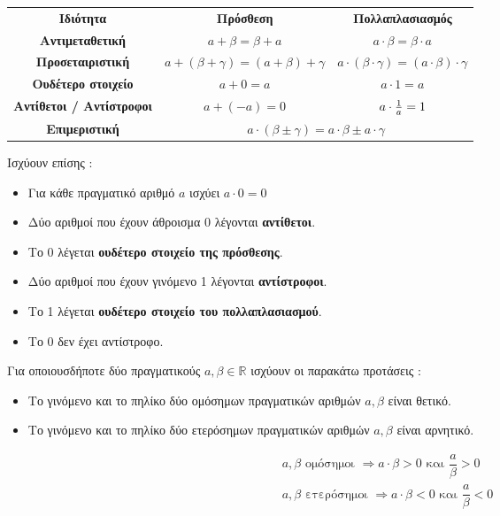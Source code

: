 \documentclass[twoside,nofonts,internet,shmeiwseis]{thewria}
\DeclareRobustCommand{\frac}[3][0pt]{%
{\begingroup\hspace{#1}#2\hspace{#1}\endgroup\over\hspace{#1}#3\hspace{#1}}}
\begin{document}
\begin{center}
\begin{tabular}{ccc}
	\hline \rule[-2ex]{0pt}{5.5ex} \textbf{Ιδιότητα} & \textbf{Πρόσθεση} & \textbf{Πολλαπλασιασμός} \\ 
	\hhline{===} \rule[-2ex]{0pt}{5.5ex} \textbf{Αντιμεταθετική} & $ a+\beta=\beta+a $ & $ a\cdot\beta=\beta\cdot a $ \\
	\rule[-2ex]{0pt}{5ex} \textbf{Προσεταιριστική} & $ a+\left( \beta+\gamma\right) =\left( a+\beta\right) +\gamma $ & $ a\cdot\left( \beta\cdot\gamma\right) =\left( a\cdot\beta\right)\cdot\gamma $\\
	\rule[-2ex]{0pt}{5ex} \textbf{Ουδέτερο στοιχείο} & $ a+0=a $ & $ a\cdot1= a $\\
	\rule[-2ex]{0pt}{5ex} \textbf{Αντίθετοι / Αντίστροφοι} & $ a+(-a)=0 $ & $ a\cdot\frac{1}{a}= 1 $\\
	\rule[-2ex]{0pt}{5ex} \textbf{Επιμεριστική} & \multicolumn{2}{c}{$ a\cdot\left( \beta\pm\gamma\right)=a\cdot\beta\pm a\cdot\gamma  $}\\
	\hline
\end{tabular}
\end{center}
Ισχύουν επίσης :
\begin{itemize}[itemsep=0mm]
\item Για κάθε πραγματικό αριθμό $ a $ ισχύει $ a\cdot0=0 $
\item Δύο αριθμοί που έχουν άθροισμα 0 λέγονται \textbf{αντίθετοι}.
\item Το 0 λέγεται \textbf{ουδέτερο στοιχείο της πρόσθεσης}.
\item Δύο αριθμοί που έχουν γινόμενο 1 λέγονται \textbf{αντίστροφοι}.
\item Το 1 λέγεται \textbf{ουδέτερο στοιχείο του πολλαπλασιασμού}.
\item Το 0 δεν έχει αντίστροφο.
\end{itemize}
Για οποιουσδήποτε δύο πραγματικούς $ a,\beta\in\mathbb{R} $ ισχύουν οι παρακάτω προτάσεις :
\begin{itemize}[itemsep=0mm]
\item Το γινόμενο και το πηλίκο δύο ομόσημων πραγματικών αριθμών $ a,\beta $ είναι θετικό.
\item Το γινόμενο και το πηλίκο δύο ετερόσημων πραγματικών αριθμών $ a,\beta $ είναι αρνητικό.
\end{itemize}
\begin{gather*}
a,\beta\textrm{ ομόσημοι }\Rightarrow a\cdot\beta>0\textrm{ και }\dfrac{a}{\beta}>0\\
a,\beta\textrm{ ετερόσημοι }\Rightarrow a\cdot\beta<0\textrm{ και }\dfrac{a}{\beta}<0
\end{gather*}
\end{document}

